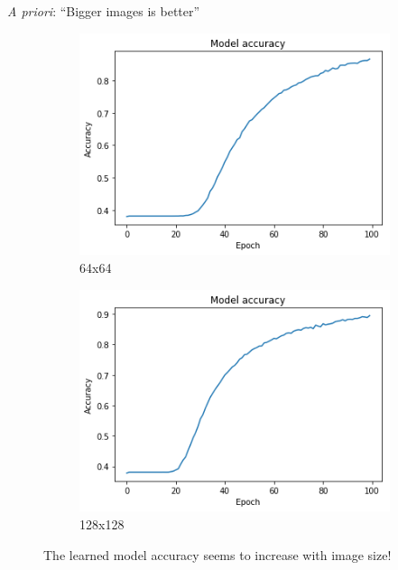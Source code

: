 \begin{frame}[c]{\emph{A priori}: ``Bigger images is better''}
\begin{figure}
        \begin{subfigure}[b]{0.4\linewidth}
            \centering
            \includegraphics[width=\linewidth]{64x64.png}
            \caption{64x64}
        \end{subfigure}
        \begin{subfigure}[b]{0.4\linewidth}
            \centering
            \includegraphics[width=\linewidth]{128x128.png}
            \caption{128x128}
        \end{subfigure}
        \caption{The learned model accuracy seems to increase with image size!}
    \end{figure}
\end{frame}

